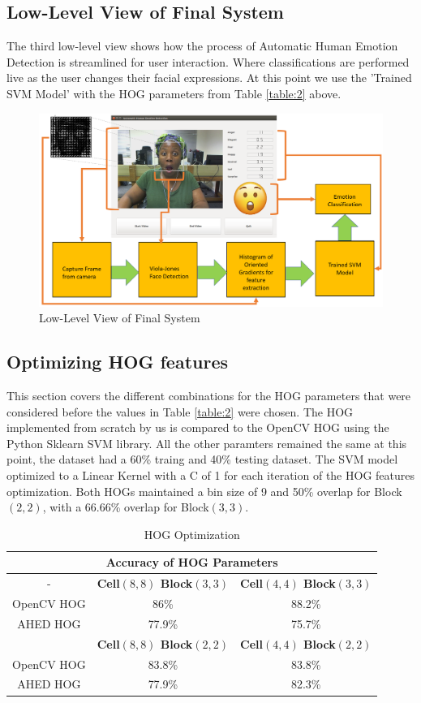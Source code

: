 \subsection{Low-Level View of Final System}
The third low-level view shows how the process of Automatic Human Emotion Detection is streamlined for user interaction. Where classifications are performed live as the user changes their facial expressions. At this point we use the 'Trained SVM Model' with the HOG parameters from Table \ref{table:2} above.
\begin{figure}[H]
  \centering
  \includegraphics[scale=0.6]{demo}
  \caption{Low-Level View of Final System}
  \label{fig: lowlevel3}
\end{figure} 

\subsection{Optimizing HOG features}
This section covers the different combinations for the HOG parameters that were considered before the values in Table \ref{table:2} were chosen. The HOG implemented from scratch by us is compared to the OpenCV HOG using the Python Sklearn SVM library. All the other paramters remained the same at this point, the dataset had a 60\% traing and 40\% testing dataset. The SVM model optimized to a Linear Kernel with a C of 1 for each iteration of the HOG features optimization. Both HOGs maintained a bin size of 9 and 50\% overlap for Block$(2,2)$, with a 66.66\% overlap for Block$(3,3)$.
\begin{table}[H]
\centering
\begin{tabular}{ |c||c|c|}
	\hline
	\multicolumn{3}{|c|}{\textbf{Accuracy of HOG Parameters}}\\
	\hline
	- & \textbf{Cell$(8,8)$ Block$(3,3)$} & \textbf{Cell$(4,4)$ Block$(3,3)$}\\
	\hline
	OpenCV HOG & 86\% & 88.2\% \\
	\hline
	AHED HOG & 77.9\% & 75.7\% \\
	\hline
	& \textbf{Cell$(8,8)$ Block$(2,2)$} & \textbf{Cell$(4,4)$ Block$(2,2)$}\\
	\hline
	OpenCV HOG & 83.8\% & 83.8\% \\
	\hline
	AHED HOG & 77.9\% & 82.3\% \\
	\hline
\end{tabular}   
\caption{HOG Optimization}
\label{table:class}
\end{table}

